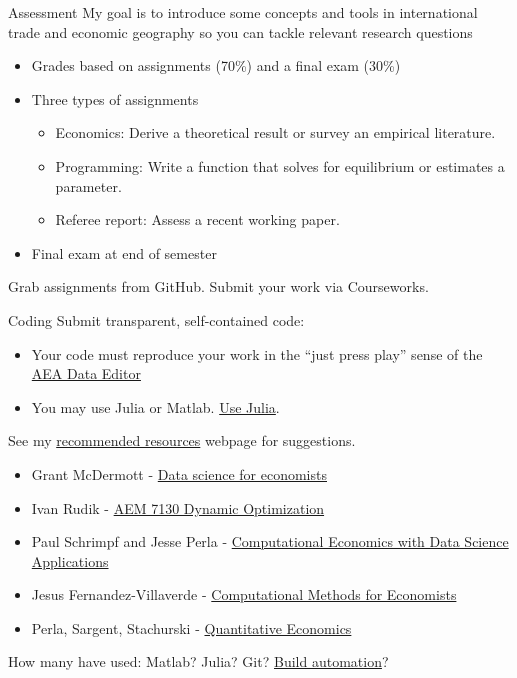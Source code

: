 \documentclass[10pt,notes=hide]{beamer}
\begin{document}
\begin{frame}{Assessment}
My goal is to introduce some concepts and tools in international trade and economic geography so you can tackle relevant research questions
\begin{itemize}
\item Grades based on assignments (70\%) and a final exam (30\%)
\item Three types of assignments
\begin{itemize}
\item Economics: Derive a theoretical result or survey an empirical literature.
\item Programming: Write a function that solves for equilibrium or estimates a parameter.
\item Referee report: Assess a recent working paper.
\end{itemize}
\item Final exam at end of semester
\end{itemize}
Grab assignments from GitHub.
Submit your work via Courseworks.
\end{frame}
\begin{frame}{Coding}
Submit transparent, self-contained code:
\begin{itemize}
\item Your code must reproduce your work in the ``just press play'' sense of the \href{https://www.aeaweb.org/journals/data/faq\#run}{AEA Data Editor}
\item You may use Julia or Matlab. \href{https://tradediversion.net/2018/09/17/why-i-encourage-econ-phd-students-to-learn-julia/}{Use Julia}.
\end{itemize}
See my \href{http://www.jdingel.com/teaching/advice.html}{recommended resources} webpage for suggestions.
\begin{itemize}
\item Grant McDermott - \href{https://github.com/uo-ec607/lectures}{Data science for economists}
\item Ivan Rudik - \href{https://github.com/AEM7130/class-repo}{AEM 7130 Dynamic Optimization}
\item Paul Schrimpf and Jesse Perla - \href{https://github.com/ubcecon/ECON622/}{Computational Economics with Data Science Applications}
\item Jesus Fernandez-Villaverde - \href{https://www.sas.upenn.edu/~jesusfv/teaching.html}{Computational Methods for Economists}
\item Perla, Sargent, Stachurski - \href{https://julia.quantecon.org/intro.html}{Quantitative Economics}
\end{itemize}
How many have used: Matlab? Julia? Git? \href{https://tradediversion.net/2019/11/06/why-your-research-project-needs-build-automation/}{Build automation}?
\end{frame}
\end{document}
